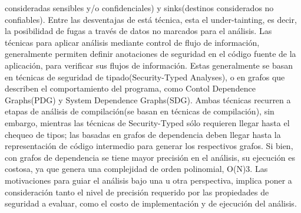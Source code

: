 consideradas sensibles y/o confidenciales) y sinks(destinos considerados no
confiables). Entre las desventajas de está técnica, esta el under-tainting, es
decir, la posibilidad de fugas a través de datos no marcados para el
análisis.\newline
Las técnicas para aplicar análisis mediante control de flujo de información,
generalmente permiten definir anotaciones de seguridad en el código fuente de la
aplicación, para verificar sus flujos de información. Estas generalmente se 
basan en técnicas de seguridad de tipado(Security-Typed Analyses), o en grafos
que describen el comportamiento del programa, como Contol Dependence Graphs(PDG)
y System Dependence Graphs(SDG).
Ambas técnicas recurren a etapas de análisis de compilación(se basan en
técnicas de compilación), sin embargo, mientras las técnicas de Security-Typed
sólo requieren llegar hasta el chequeo de tipos; las basadas en grafos de
dependencia deben llegar hasta la representación de código intermedio para
generar los respectivos grafos. Si bien, con grafos de dependencia se tiene
mayor precisión en el análisis, su ejecución es costosa, ya que genera una
complejidad de orden polinomial, O(N)3\cite[page 3]{FCO-PDG}.
Las motivaciones para guiar el análisis bajo una u otra perspectiva, implica
poner a consideración tanto el nivel de precisión requerido por las propiedades
de seguridad a evaluar, como el costo de implementación y de ejecución del
análisis. \newline


 

% 
	
